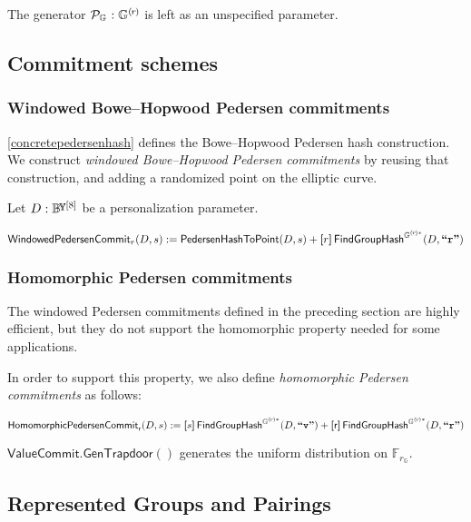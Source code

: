 \documentclass{article}
\newcommand{\crossref}[1]{\autoref{#1}}
\newcommand{\typecolon}{:}
\newcommand{\overlap}[2]{\rlap{#2}\hspace{#1}{#2}}
\newcommand{\byte}{\mathbb{B}\kern -0.1em\raisebox{0.48ex}{\overlap{0.0001em}{\scalebox{0.7}{$\mathbb{Y}$}}}}
\newcommand{\Field}[1]{\mathbb{F}_{\!#1}}
\newcommand{\typeexp}[2]{{#1}\vphantom{)}^{[{#2}]}}
\newcommand{\byteseq}[1]{\typeexp{\byte}{#1}}
\newcommand{\ascii}[1]{\textbf{``\texttt{#1}''}}
\newcommand{\scalarmult}[2]{\boldsymbol{[}{#1}\boldsymbol{]}\,{#2}}
\newcommand{\Generator}{\mathcal{P}}
\newcommand{\subgroupr}{(\kern-0.075emr\kern-0.075em)}
\newcommand{\FindGroupHash}{\mathsf{FindGroupHash}}
\newcommand{\ParamG}[1]{{{#1}_\mathbb{G}}}
\newcommand{\GroupG}[1]{\mathbb{G}_{#1}}
\newcommand{\SubgroupG}[1]{\GroupG{#1}^{\subgroupr}}
\newcommand{\SubgroupGstar}[1]{\GroupG{#1}^{\subgroupr\ast}}
\newcommand{\GenG}[1]{\Generator_{\GroupG{#1}}}
\newcommand{\FindGroupGHash}{\FindGroupHash^{\SubgroupGstar{}}}
\newcommand{\PedersenHashToPoint}{\mathsf{PedersenHashToPoint}}
\newcommand{\WindowedPedersenCommitAlg}{\mathsf{WindowedPedersenCommit}}
\newcommand{\WindowedPedersenCommit}[1]{\WindowedPedersenCommitAlg_{#1}}
\newcommand{\HomomorphicPedersenCommitAlg}{\mathsf{HomomorphicPedersenCommit}}
\newcommand{\HomomorphicPedersenCommit}[1]{\HomomorphicPedersenCommitAlg_{#1}}
\newcommand{\ValueCommitAlg}{\mathsf{ValueCommit}}
\newcommand{\ValueCommitGenTrapdoor}{\ValueCommitAlg\mathsf{.GenTrapdoor}}
\newcommand{\ValueCommitRand}{\mathsf{r}}
\begin{document}
The generator $\GenG{} \typecolon \SubgroupG{}$ is left as an unspecified parameter.


\subsection{Commitment schemes} \label{concretecommit}

\subsubsection{Windowed Bowe--Hopwood Pedersen commitments} \label{concretewindowedcommit}

\crossref{concretepedersenhash} defines the Bowe--Hopwood Pedersen hash construction.
We construct \emph{windowed Bowe--Hopwood Pedersen commitments} by reusing that construction,
and adding a randomized point on the elliptic curve.

Let $D \typecolon \byteseq{8}$ be a personalization parameter.

\begin{formulae}
  \item $\WindowedPedersenCommit{r}(D, s) :=
           \PedersenHashToPoint(D, s) + \scalarmult{r}{\FindGroupGHash(D, \ascii{r})}$
\end{formulae}


\subsubsection{Homomorphic Pedersen commitments} \label{concretehomomorphiccommit}

The windowed Pedersen commitments defined in the preceding section are
highly efficient, but they do not support the homomorphic property needed
for some applications.

In order to support this property, we also define \emph{homomorphic Pedersen commitments}
as follows:

\begin{formulae}
  \item $\HomomorphicPedersenCommit{\ValueCommitRand}(D, s) :=
           \scalarmult{s}{\FindGroupGHash(D, \ascii{v})} + \scalarmult{\ValueCommitRand}{\FindGroupGHash(D, \ascii{r})}$
  \item $\ValueCommitGenTrapdoor()$ generates the uniform distribution on $\Field{\ParamG{r}}$.
\end{formulae}


\subsection{Represented Groups and Pairings} \label{concretepairing}
\end{document}
